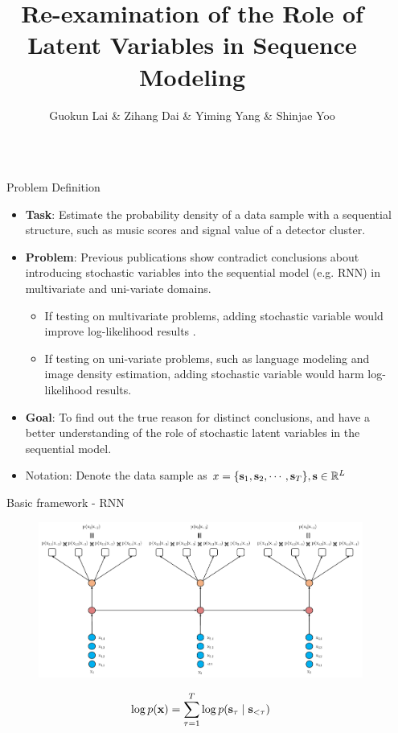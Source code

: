 \documentclass[final]{beamer}
\title{Re-examination of the Role of Latent Variables in Sequence Modeling}
\author{Guokun Lai \inst{1} \& Zihang Dai \inst{1} \& Yiming Yang \inst{1} \& Shinjae Yoo \inst{2}}
\institute[shortinst]{\inst{1} Carnegie Mellon University \samelineand \inst{2} Brookhaven National Laboratory}
\newlength{\sepwidth}
\newlength{\colwidth}
\newcommand{\separatorcolumn}{\begin{column}{\sepwidth}\end{column}}
\begin{document}
\begin{frame}[t]
\begin{columns}[t]
\separatorcolumn

\begin{column}{\colwidth}

  \begin{block}{Problem Definition}

	    \begin{itemize}
		\item \textbf{Task}: Estimate the probability density of a data sample with a sequential structure, such as music scores and signal value of a detector cluster. 
		\item \textbf{Problem}: Previous publications show contradict conclusions about introducing stochastic variables into the sequential model (e.g. RNN) in multivariate and uni-variate domains. 
	    \begin{itemize}
			\item If testing on multivariate problems, adding stochastic variable would improve log-likelihood results \cite{chung2015recurrent,fraccaro2016sequential,goyal2017z}.
			\item If testing on uni-variate problems, such as language modeling and image density estimation, adding stochastic variable would harm log-likelihood results.
		\end{itemize} 
		\item \textbf{Goal}: To find out the true reason for distinct conclusions, and have a better understanding of the role of stochastic latent variables in the sequential model. 
		\item Notation: Denote the data sample as $x = \{{\mathbf{s}}_1, {\mathbf{s}}_2, \cdots, {\mathbf{s}}_T\}, {\mathbf{s}} \in \mathbb{R}^L $
		\end{itemize}
		\vspace{-1em}
  \end{block}

  \begin{block}{Basic framework - RNN}
	\begin{figure}
		\includegraphics[width=0.9\linewidth]{fig/RNN-L4.pdf}
	\end{figure}
	\vspace{-1em}
	\begin{align*}
	\log p({\mathbf{x}}) 
	= \sum_{\tau=1}^{T} \log p({\mathbf{s}}_{\tau} \mid {\mathbf{s}}_{<\tau})
	\end{align*}
	\vspace{-1em}
  \end{block}


\end{column}
\end{columns}
\end{frame}
\end{document}
